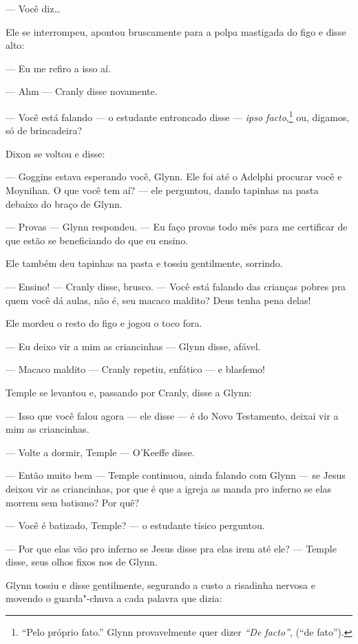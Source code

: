  --- Você diz\ldots{}

Ele se interrompeu, apontou bruscamente para a polpa mastigada do figo e
disse alto:

 --- Eu me refiro a isso aí.

 --- Ahm --- Cranly disse novamente.

 --- Você está falando --- o estudante entroncado disse --- \textit{ipso
facto},\footnote{ “Pelo próprio fato.” Glynn provavelmente quer dizer 
\textit{“De facto”}, (“de fato”).} ou, digamos, só de brincadeira?

Dixon se voltou e disse:

 --- Goggins estava esperando você, Glynn. Ele foi até o Adelphi procurar
você e Moynihan. O que você tem aí? --- ele perguntou, dando tapinhas na
pasta debaixo do braço de Glynn.

 --- Provas --- Glynn respondeu. --- Eu faço provas todo mês para me certificar de
que estão se beneficiando do que eu ensino.

Ele também deu tapinhas na pasta e tossiu gentilmente, sorrindo.

 --- Ensino! --- Cranly disse, brusco. --- Você está falando das crianças pobres
pra quem você dá aulas, não é, seu macaco maldito? Deus tenha pena
delas!

Ele mordeu o resto do figo e jogou o toco fora.

 --- Eu deixo vir a mim as criancinhas --- Glynn disse, afável.

 --- Macaco maldito --- Cranly repetiu, enfático --- e blasfemo!

Temple se levantou e, passando por Cranly, disse a Glynn:

 --- Isso que você falou agora --- ele disse --- é do Novo Testamento, deixai vir
a mim as criancinhas.

 --- Volte a dormir, Temple --- O’Keeffe disse.

 --- Então muito bem --- Temple continuou, ainda falando com Glynn --- se Jesus
deixou vir as criancinhas, por que é que a igreja as manda pro inferno
se elas morrem sem batismo? Por quê?

 --- Você é batizado, Temple? --- o estudante tísico perguntou.

 --- Por que elas vão pro inferno se Jesus disse pra elas irem até ele? --- Temple disse, seus olhos fixos nos de Glynn.

Glynn tossiu e disse gentilmente, segurando a custo a risadinha nervosa
e movendo o guarda"-chuva a cada palavra que dizia:

